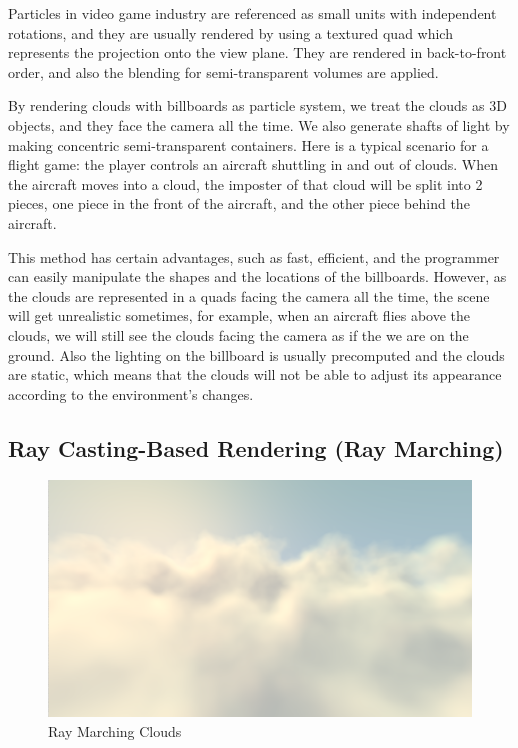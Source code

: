 Particles in video game industry are referenced as small units with independent rotations, and they are usually rendered by using a textured quad which represents the projection onto the view plane. They are rendered in back-to-front order, and also the blending for semi-transparent volumes are applied.

By rendering clouds with billboards as particle system, we treat the clouds as 3D objects, and they face the camera all the time. We also generate shafts of light by making concentric semi-transparent containers. Here is a typical scenario for a flight game: the player controls an aircraft shuttling in and out of clouds. When the aircraft moves into a cloud, the imposter of that cloud will be split into 2 pieces, one piece in the front of the aircraft, and the other piece behind the aircraft.

This method has certain advantages, such as fast, efficient, and the programmer can easily manipulate the shapes and the locations of the billboards. However, as the clouds are represented in a quads facing the camera all the time, the scene will get unrealistic sometimes, for example, when an aircraft flies above the clouds, we will still see the clouds facing the camera as if the we are on the ground. Also the lighting on the billboard is usually precomputed and the clouds are static, which means that the clouds will not be able to adjust its appearance according to the environment's changes.

\subsection{Ray Casting-Based Rendering (Ray Marching)}

\begin{figure}[htp]
\begin{center}
\includegraphics[scale=0.4]{images/raymarching.png}
\caption{Ray Marching Clouds}
\label{f3}
\end{center}
\end{figure}

